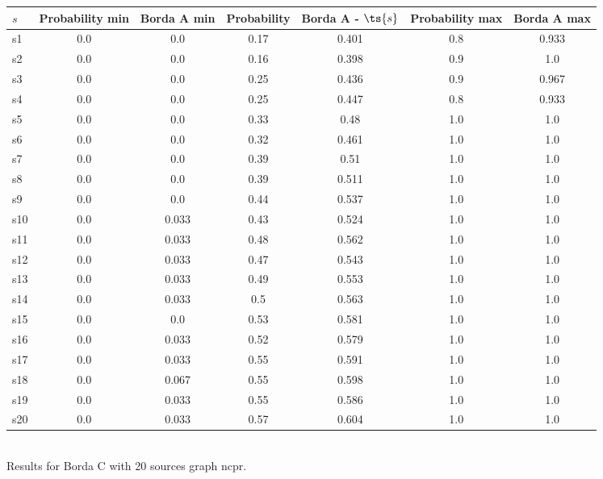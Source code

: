 \documentclass{article}
\begin{document}
\noindent\begin{tabular}{|l|c|c|c|c|c|c|}
\hline
$s$& Probability min & Borda A min & Probability & Borda A - $\ts{s}$ & Probability max & Borda A max\\
\hline
s1 &0.0 & 0.0 & 0.17 & 0.401 & 0.8 & 0.933\\
\hline
s2 &0.0 & 0.0 & 0.16 & 0.398 & 0.9 & 1.0\\
\hline
s3 &0.0 & 0.0 & 0.25 & 0.436 & 0.9 & 0.967\\
\hline
s4 &0.0 & 0.0 & 0.25 & 0.447 & 0.8 & 0.933\\
\hline
s5 &0.0 & 0.0 & 0.33 & 0.48 & 1.0 & 1.0\\
\hline
s6 &0.0 & 0.0 & 0.32 & 0.461 & 1.0 & 1.0\\
\hline
s7 &0.0 & 0.0 & 0.39 & 0.51 & 1.0 & 1.0\\
\hline
s8 &0.0 & 0.0 & 0.39 & 0.511 & 1.0 & 1.0\\
\hline
s9 &0.0 & 0.0 & 0.44 & 0.537 & 1.0 & 1.0\\
\hline
s10 &0.0 & 0.033 & 0.43 & 0.524 & 1.0 & 1.0\\
\hline
s11 &0.0 & 0.033 & 0.48 & 0.562 & 1.0 & 1.0\\
\hline
s12 &0.0 & 0.033 & 0.47 & 0.543 & 1.0 & 1.0\\
\hline
s13 &0.0 & 0.033 & 0.49 & 0.553 & 1.0 & 1.0\\
\hline
s14 &0.0 & 0.033 & 0.5 & 0.563 & 1.0 & 1.0\\
\hline
s15 &0.0 & 0.0 & 0.53 & 0.581 & 1.0 & 1.0\\
\hline
s16 &0.0 & 0.033 & 0.52 & 0.579 & 1.0 & 1.0\\
\hline
s17 &0.0 & 0.033 & 0.55 & 0.591 & 1.0 & 1.0\\
\hline
s18 &0.0 & 0.067 & 0.55 & 0.598 & 1.0 & 1.0\\
\hline
s19 &0.0 & 0.033 & 0.55 & 0.586 & 1.0 & 1.0\\
\hline
s20 &0.0 & 0.033 & 0.57 & 0.604 & 1.0 & 1.0\\
\hline
\end{tabular}\\

\noindent Results for Borda C with 20 sources graph ncpr.
\end{document}
